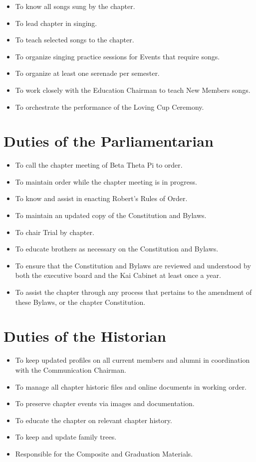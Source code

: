\begin{itemize}

\item To know all songs sung by the chapter.
\item To lead chapter in singing.
\item To teach selected songs to the chapter.
\item To organize singing practice sessions for Events that require songs.
\item To organize at least one serenade per semester.
\item To work closely with the Education Chairman to teach New Members songs.
\item To orchestrate the performance of the Loving Cup Ceremony.
\end{itemize}

\section{Duties of the Parliamentarian}
\label{sec:duties-of-the-parliamentarian}

\begin{itemize}

\item To call the chapter meeting of Beta Theta Pi to order.
\item To maintain order while the chapter meeting is in progress.
\item To know and assist in enacting Robert’s Rules of Order.
\item To maintain an updated copy of the Constitution and Bylaws.
\item To chair Trial by chapter.
\item To educate brothers as necessary on the Constitution and Bylaws.
\item To ensure that the Constitution and Bylaws are reviewed and understood by
    both the executive board and the Kai Cabinet at least once a year.
\item To assist the chapter through any process that pertains to the amendment
    of these Bylaws, or the chapter Constitution.
\end{itemize}

\section{Duties of the Historian}
\label{sec:duties-of-the-historian}

\begin{itemize}

\item To keep updated profiles on all current members and alumni in
    coordination with the Communication Chairman.
\item To manage all chapter historic files and online documents in working
    order.
\item To preserve chapter events via images and documentation.
\item To educate the chapter on relevant chapter history.
\item To keep and update family trees.
\item Responsible for the Composite and Graduation Materials.
\end{itemize}
